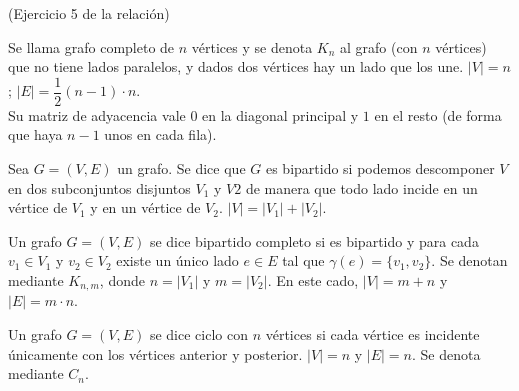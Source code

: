 \begin{ejercicio}(Ejercicio 5 de la relación)\
    \begin{center}
    \end{center}
\end{ejercicio} 

\begin{definicion}
    Se llama grafo completo de $n$ vértices y se denota $K_n$ al grafo (con $n$ vértices) que no tiene lados paralelos, y dados dos vértices hay un lado que los une. $|V|=n$; $|E| = \dfrac{1}{2}(n-1) \cdot n$.\\

    Su matriz de adyacencia vale $0$ en la diagonal principal y $1$ en el resto (de forma que haya $n-1$ unos en cada fila).
\end{definicion}

\begin{definicion}
    Sea $G=(V,E)$ un grafo. Se dice que $G$ es bipartido si podemos descomponer $V$ en dos subconjuntos disjuntos $V_1$ y $V2$ de manera que todo lado incide en un vértice de $V_1$ y en un vértice de $V_2$. $|V| = |V_1| + |V_2|$.
\end{definicion}

\begin{definicion}
    Un grafo $G=(V,E)$ se dice bipartido completo si es bipartido y para cada $v_1\in V_1$ y $v_2\in V_2$ existe un único lado $e\in E$ tal que $\gamma(e)=\{v_1,v_2\}$. Se denotan mediante $K_{n,m}$, donde $n=|V_1|$ y $m=|V_2|$. En este cado, $|V| = m + n $ y $|E| = m \cdot n$.
\end{definicion}

\begin{definicion}
    Un grafo $G=(V,E)$ se dice ciclo con $n$ vértices si cada vértice es incidente únicamente con los vértices anterior y posterior. $|V|=n$ y $|E|=n$. Se denota mediante $C_n$.
\end{definicion}

